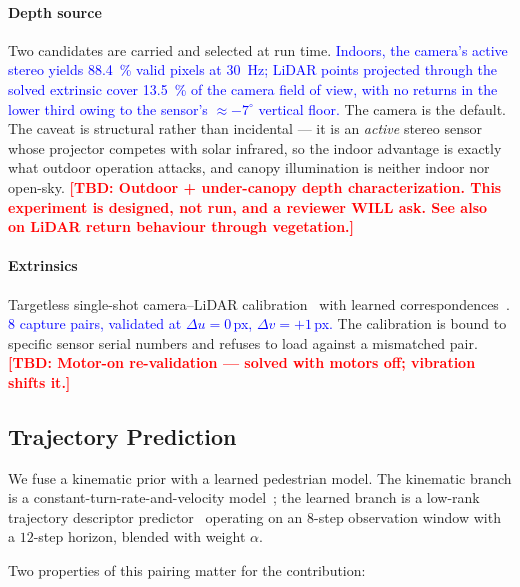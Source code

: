 \documentclass[conference]{IEEEtran}
\newcommand{\tbd}[1]{\textcolor{red}{\textbf{[TBD: #1]}}}
\newcommand{\bench}[1]{\textcolor{blue}{#1}}
\begin{document}
\paragraph{Depth source} Two candidates are carried and selected at run time.
\bench{Indoors, the camera's active stereo yields \SI{88.4}{\percent} valid
pixels at \SI{30}{\hertz}; LiDAR points projected through the solved extrinsic
cover \SI{13.5}{\percent} of the camera field of view, with no returns in the
lower third owing to the sensor's ${\approx}-7^\circ$ vertical floor.} The camera
is the default. The caveat is structural rather than incidental --- it is an
\emph{active} stereo sensor whose projector competes with solar infrared, so the
indoor advantage is exactly what outdoor operation attacks, and canopy
illumination is neither indoor nor open-sky.
\tbd{Outdoor + under-canopy depth characterization. This experiment is designed,
not run, and a reviewer WILL ask. See also~\cite{canopy2026} on LiDAR return
behaviour through vegetation.}

\paragraph{Extrinsics} Targetless single-shot camera--LiDAR
calibration~\cite{koide2023calibration} with learned
correspondences~\cite{sarlin2020superglue}. \bench{8 capture pairs, validated at
$\Delta u = 0$\,px, $\Delta v = +1$\,px.} The calibration is bound to specific
sensor serial numbers and refuses to load against a mismatched pair.
\tbd{Motor-on re-validation --- solved with motors off; vibration shifts it.}

\subsection{Trajectory Prediction}
\label{sec:prediction}
We fuse a kinematic prior with a learned pedestrian model. The kinematic branch
is a constant-turn-rate-and-velocity
model~\cite{schubert2008comparison}; the learned branch is a low-rank trajectory
descriptor predictor~\cite{bae2023eigentrajectory} operating on an
$8$-step observation window with a $12$-step horizon, blended with weight
$\alpha$.

Two properties of this pairing matter for the contribution:
\end{document}
